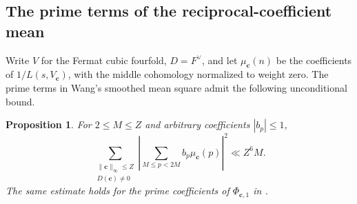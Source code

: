 \documentclass[11pt,letterpaper]{article}
\newtheorem{proposition}[proposition]{Proposition}
\theoremstyle{definition}
\begin{document}
\subsection{The prime terms of the reciprocal-coefficient mean}
Write $V$ for the Fermat cubic fourfold, $D=F^\vee$, and let
$\mu_{\mathbf c}(n)$ be the coefficients of $1/L(s,V_{\mathbf c})$,
with the middle cohomology normalized to weight zero. The prime terms
in Wang's smoothed mean square admit the following unconditional bound.
\begin{proposition}\label{c3:primemean}
For $2\le M\le Z$ and arbitrary coefficients $|b_p|\le1$,
\[
 \sum_{\substack{\|\mathbf c\|_\infty\le Z\\D(\mathbf c)\ne0}}
 \left|\sum_{M\le p<2M} b_p\mu_{\mathbf c}(p)\right|^2
       \ll Z^6 M.
\]
The same estimate holds for the prime coefficients of
$\Phi_{\mathbf c,1}$ in \cite[Conjectures~6.4, 6.7]{c3:wang}.
\end{proposition}
\end{document}
